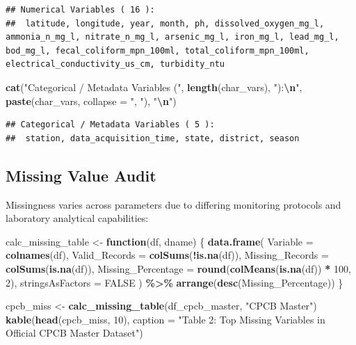 \documentclass[
]{article}
\newenvironment{Shaded}{\begin{snugshade}}{\end{snugshade}}
\newcommand{\AttributeTok}[1]{\textcolor[rgb]{0.13,0.29,0.53}{#1}}
\newcommand{\ConstantTok}[1]{\textcolor[rgb]{0.56,0.35,0.01}{#1}}
\newcommand{\ControlFlowTok}[1]{\textcolor[rgb]{0.13,0.29,0.53}{\textbf{#1}}}
\newcommand{\DecValTok}[1]{\textcolor[rgb]{0.00,0.00,0.81}{#1}}
\newcommand{\FunctionTok}[1]{\textcolor[rgb]{0.13,0.29,0.53}{\textbf{#1}}}
\newcommand{\NormalTok}[1]{#1}
\newcommand{\OtherTok}[1]{\textcolor[rgb]{0.56,0.35,0.01}{#1}}
\newcommand{\SpecialCharTok}[1]{\textcolor[rgb]{0.81,0.36,0.00}{\textbf{#1}}}
\newcommand{\StringTok}[1]{\textcolor[rgb]{0.31,0.60,0.02}{#1}}
\begin{document}
\begin{verbatim}
## Numerical Variables ( 16 ):
##  latitude, longitude, year, month, ph, dissolved_oxygen_mg_l, ammonia_n_mg_l, nitrate_n_mg_l, arsenic_mg_l, iron_mg_l, lead_mg_l, bod_mg_l, fecal_coliform_mpn_100ml, total_coliform_mpn_100ml, electrical_conductivity_us_cm, turbidity_ntu
\end{verbatim}

\begin{Shaded}
\begin{Highlighting}[]
\FunctionTok{cat}\NormalTok{(}\StringTok{"Categorical / Metadata Variables ("}\NormalTok{, }\FunctionTok{length}\NormalTok{(char\_vars), }\StringTok{"):}\SpecialCharTok{\textbackslash{}n}\StringTok{"}\NormalTok{, }\FunctionTok{paste}\NormalTok{(char\_vars, }\AttributeTok{collapse =} \StringTok{", "}\NormalTok{), }\StringTok{"}\SpecialCharTok{\textbackslash{}n}\StringTok{"}\NormalTok{)}
\end{Highlighting}
\end{Shaded}

\begin{verbatim}
## Categorical / Metadata Variables ( 5 ):
##  station, data_acquisition_time, state, district, season
\end{verbatim}

\subsection{Missing Value Audit}\label{missing-value-audit}

Missingness varies across parameters due to differing monitoring
protocols and laboratory analytical capabilities:

\begin{Shaded}
\begin{Highlighting}[]
\NormalTok{calc\_missing\_table }\OtherTok{\textless{}{-}} \ControlFlowTok{function}\NormalTok{(df, dname) \{}
  \FunctionTok{data.frame}\NormalTok{(}
    \AttributeTok{Variable =} \FunctionTok{colnames}\NormalTok{(df),}
    \AttributeTok{Valid\_Records =} \FunctionTok{colSums}\NormalTok{(}\SpecialCharTok{!}\FunctionTok{is.na}\NormalTok{(df)),}
    \AttributeTok{Missing\_Records =} \FunctionTok{colSums}\NormalTok{(}\FunctionTok{is.na}\NormalTok{(df)),}
    \AttributeTok{Missing\_Percentage =} \FunctionTok{round}\NormalTok{(}\FunctionTok{colMeans}\NormalTok{(}\FunctionTok{is.na}\NormalTok{(df)) }\SpecialCharTok{*} \DecValTok{100}\NormalTok{, }\DecValTok{2}\NormalTok{),}
    \AttributeTok{stringsAsFactors =} \ConstantTok{FALSE}
\NormalTok{  ) }\SpecialCharTok{\%\textgreater{}\%} \FunctionTok{arrange}\NormalTok{(}\FunctionTok{desc}\NormalTok{(Missing\_Percentage))}
\NormalTok{\}}

\NormalTok{cpcb\_miss }\OtherTok{\textless{}{-}} \FunctionTok{calc\_missing\_table}\NormalTok{(df\_cpcb\_master, }\StringTok{"CPCB Master"}\NormalTok{)}
\FunctionTok{kable}\NormalTok{(}\FunctionTok{head}\NormalTok{(cpcb\_miss, }\DecValTok{10}\NormalTok{), }\AttributeTok{caption =} \StringTok{"Table 2: Top Missing Variables in Official CPCB Master Dataset"}\NormalTok{)}
\end{Highlighting}
\end{Shaded}
\end{document}
